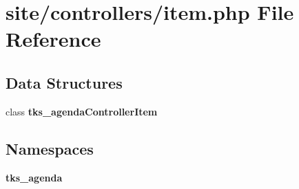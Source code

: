 \section{site/controllers/item.php File Reference}
\label{site_2controllers_2item_8php}
\subsection*{Data Structures}
\begin{DoxyCompactItemize}
\item 
class \textbf{ tks\+\_\+agenda\+Controller\+Item}
\end{DoxyCompactItemize}
\subsection*{Namespaces}
\begin{DoxyCompactItemize}
\item 
 \textbf{ tks\+\_\+agenda}
\end{DoxyCompactItemize}
